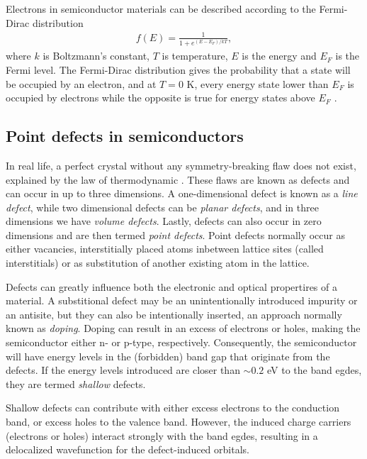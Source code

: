 Electrons in semiconductor materials can be described according to the Fermi-Dirac distribution
\begin{align*}
  f(E) = \frac{1}{1+e^{(E-E_F)/kT}},
\end{align*}
where $k$ is Boltzmann's constant, $T$ is temperature, $E$ is the energy and $E_F$ is the Fermi level. The Fermi-Dirac distribution gives the probability that a state will be occupied by an electron, and at $T=0$ K, every energy state lower than $E_F$ is occupied by electrons while the opposite is true for energy states above $E_F$ \cite{BenStreetman2015}.

\subsection{Point defects in semiconductors}

In real life, a perfect crystal without any symmetry-breaking flaw does not exist, explained by the law of thermodynamic \cite{CharlesKittel2012}. These flaws are known as defects and can occur in up to three dimensions. A one-dimensional defect is known as a \textit{line defect}, while two dimensional defects can be \textit{planar defects}, and in three dimensions we have \textit{volume defects}. Lastly, defects can also occur in zero dimensions and are then termed \textit{point defects}. Point defects normally occur as either vacancies, interstitially placed atoms inbetween lattice sites (called interstitials) or as substitution of another existing atom in the lattice.

Defects can greatly influence both the electronic and optical propertires of a material. A substitional defect may be an unintentionally introduced impurity or an antisite, but they can also be intentionally inserted, an approach normally known as \textit{doping}. Doping can result in an excess of electrons or holes, making the semiconductor either n- or p-type, respectively. Consequently, the semiconductor will have energy levels in the (forbidden) band gap that originate from the defects. If the energy levels introduced are closer than $ \sim 0.2$ eV to the band egdes, they are termed \textit{shallow} defects.

Shallow defects can contribute with either excess electrons to the conduction band, or excess holes to the valence band. However, the induced charge carriers (electrons or holes) interact strongly with the band egdes, resulting in a delocalized wavefunction for the defect-induced orbitals.%

